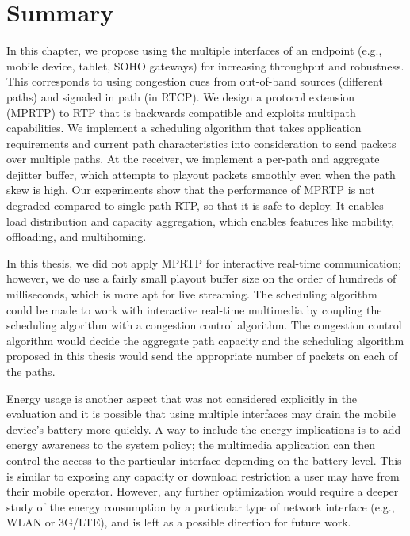 

\section{Summary}

In this chapter, we propose using the multiple interfaces of an endpoint (e.g.,
mobile device, tablet, SOHO gateways) for increasing throughput and
robustness. This corresponds to using congestion cues from out-of-band  sources
(different paths) and signaled in path (in RTCP). We design a protocol
extension (MPRTP) to RTP that is backwards compatible and exploits multipath
capabilities. We implement a scheduling algorithm that takes application
requirements and current path characteristics into consideration to send
packets over multiple paths. At the receiver, we implement a per-path and
aggregate dejitter buffer, which attempts to playout packets smoothly even
when the path skew is high. Our experiments show that the performance of MPRTP
is not degraded compared to single path RTP, so that it is safe to deploy. It
enables load distribution and capacity aggregation, which enables features
like mobility, offloading, and multihoming.

In this thesis, we did not apply MPRTP for interactive real-time
communication; however, we do use a fairly small playout buffer size on the order of
hundreds of milliseconds, which is more apt for live streaming. The scheduling
algorithm could be made to work with interactive real-time multimedia by
coupling the scheduling algorithm with a congestion control algorithm. The
congestion control algorithm would decide the aggregate path capacity and the
scheduling algorithm proposed in this thesis would send the appropriate number
of packets on each of the paths.

Energy usage is another aspect that was not considered explicitly in the
evaluation and it is possible that using multiple interfaces may drain the
mobile device's battery more quickly. A way to include the energy implications
is to add energy awareness to the system policy; the multimedia application
can then control the access to the particular interface depending on the
battery level. This is similar to exposing any capacity or download
restriction a user may have from their mobile operator. However, any further
optimization would require a deeper study of the energy consumption by a
particular type of network interface (e.g., WLAN or 3G/LTE), and is left as a
possible direction for future work.
